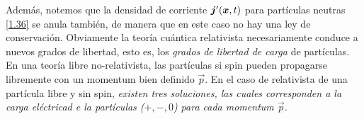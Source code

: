 Además, notemos que la densidad de corriente $\vb*{j}'(\vb*{x},t) $ para partículas neutras \eqref{1.36} se anula también, de manera que en este caso no hay una ley de conservación. Obviamente la teoría cuántica relativista necesariamente conduce a nuevos grados de libertad, esto es, los \textit{grados de libertad de carga} de partículas. En una teoría libre no-relativista, las partículas si spin pueden propagarse libremente con un momentum bien definido $\vec{p}$. En el caso de relativista de una partícula libre y sin spin, \textit{existen tres soluciones, las cuales corresponden a la carga eléctricad e la partículas ($+,-,0$) para cada momentum $\vec{p}$.}







































































